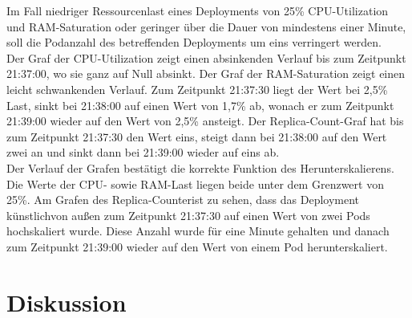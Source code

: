 \documentclass[a4paper,10pt]{scrartcl}
\begin{document}
\begin{description}
Im Fall niedriger Ressourcenlast eines Deployments von 25\% CPU-Utilization und RAM-Saturation oder geringer über die Dauer von mindestens einer Minute, soll die Podanzahl des betreffenden Deployments um eins verringert werden.\\
Der Graf der CPU-Utilization zeigt einen absinkenden Verlauf bis zum Zeitpunkt 21:37:00, wo sie ganz auf Null absinkt. Der Graf der RAM-Saturation zeigt einen leicht schwankenden Verlauf. Zum Zeitpunkt 21:37:30 liegt der Wert bei 2,5\% Last, sinkt bei 21:38:00 auf einen Wert von 1,7\% ab, wonach er zum Zeitpunkt 21:39:00 wieder auf den Wert von 2,5\% ansteigt.
Der \glqq Replica-Count\grqq -Graf hat bis zum Zeitpunkt 21:37:30 den Wert eins, steigt dann bei 21:38:00 auf den Wert zwei an und sinkt dann bei 21:39:00 wieder auf eins ab.\\
Der Verlauf der Grafen bestätigt die korrekte Funktion des Herunterskalierens. Die Werte der CPU- sowie RAM-Last liegen beide unter dem Grenzwert von 25\%. Am Grafen des \glqq Replica-Counter\grqq ist zu sehen, dass das Deployment \glqq künstlich\grqq von außen zum Zeitpunkt 21:37:30 auf einen Wert von zwei Pods hochskaliert wurde. Diese Anzahl wurde für eine Minute gehalten und danach zum Zeitpunkt 21:39:00 wieder auf den Wert von einem Pod herunterskaliert.

\end{description}

\pagebreak

\section{Diskussion}
\end{document}
